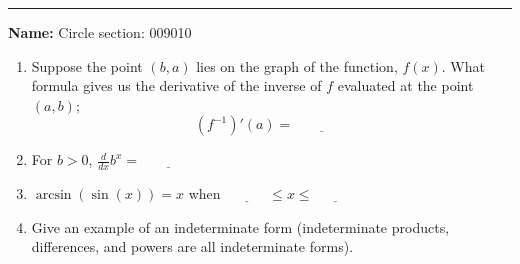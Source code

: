 \documentclass[11pt]{article}
\newcommand{\ddx}{\frac{d}{dx}}
\begin{document}
    \hrule
    \vspace{.5cm}
    \noindent\textbf{Name:} \underline{\qquad\qquad\qquad\qquad\qquad\qquad\qquad\qquad\qquad\qquad\qquad\qquad\qquad}Circle section: 009\phantom{.....}010

    \begin{enumerate}
        \item Suppose the point $(b,a)$ lies on the graph of the function, $f(x)$. What formula gives us the derivative of the inverse of $f$ evaluated at the point $(a,b)$;\vspace{1cm} $$(f^{-1})'(a)=\underline{\phantom{..............}}$$\vfill
        \item For $b>0$, $\ddx b^{x}=\underline{\phantom{..............}}$\vfill
        \item $\arcsin(\sin(x))=x$ when $\underline{\phantom{...........}}\leq x\leq \underline{\phantom{...........}}$\vfill
        \item Give an example of an indeterminate form (indeterminate products, differences, and powers are all indeterminate forms).\vfill
    \end{enumerate}
\end{document}
